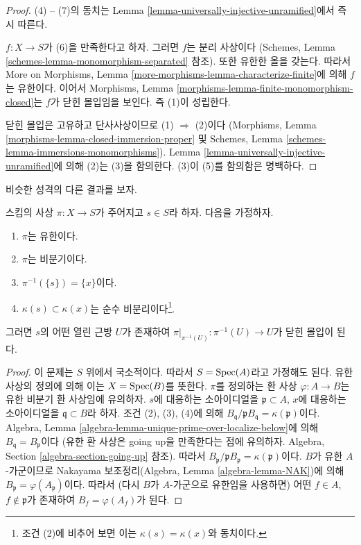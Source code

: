 \begin{proof}
(4) -- (7)의 동치는 Lemma
\ref{lemma-universally-injective-unramified}에서 즉시 따른다.

\medskip\noindent
$f : X \to S$가 (6)을 만족한다고 하자. 그러면 $f$는 분리 사상이다
(Schemes, Lemma
\ref{schemes-lemma-monomorphism-separated} 참조).
또한 유한한 올을 갖는다. 따라서
More on Morphisms, Lemma
\ref{more-morphisms-lemma-characterize-finite}에 의해 $f$는
유한이다. 이어서 Morphisms, Lemma
\ref{morphisms-lemma-finite-monomorphism-closed}는 $f$가
닫힌 몰입임을 보인다. 즉 (1)이 성립한다.

\medskip\noindent
닫힌 몰입은 고유하고 단사사상이므로 (1) $\Rightarrow$ (2)이다
(Morphisms, Lemma
\ref{morphisms-lemma-closed-immersion-proper} 및
Schemes, Lemma
\ref{schemes-lemma-immersions-monomorphisms}).
Lemma \ref{lemma-universally-injective-unramified}에 의해 (2)는
(3)을 함의한다. (3)이 (5)를 함의함은 명백하다.
\end{proof}

\noindent
비슷한 성격의 다른 결과를 보자.

\begin{lemma}
\label{lemma-finite-unramified-one-point}
스킴의 사상 $\pi : X \to S$가 주어지고 $s \in S$라 하자.
다음을 가정하자.
\begin{enumerate}
\item $\pi$는 유한이다.
\item $\pi$는 비분기이다.
\item $\pi^{-1}(\{s\}) = \{x\}$이다.
\item $\kappa(s) \subset \kappa(x)$는 순수
비분리이다\footnote{조건 (2)에 비추어 보면 이는
$\kappa(s) = \kappa(x)$와 동치이다.}.
\end{enumerate}
그러면 $s$의 어떤 열린 근방 $U$가 존재하여
$\pi|_{\pi^{-1}(U)} : \pi^{-1}(U) \to U$가 닫힌 몰입이 된다.
\end{lemma}

\begin{proof}
이 문제는 $S$ 위에서 국소적이다. 따라서 $S = \mathop{\mathrm{Spec}}(A)$라고
가정해도 된다. 유한 사상의 정의에 의해 이는 $X = \mathop{\mathrm{Spec}}(B)$를
뜻한다. $\pi$를 정의하는 환 사상 $\varphi : A \to B$는
유한 비분기 환 사상임에 유의하자.
$s$에 대응하는 소아이디얼을 $\mathfrak p \subset A$,
$x$에 대응하는 소아이디얼을 $\mathfrak q \subset B$라 하자.
조건 (2), (3), (4)에 의해
$B_{\mathfrak q}/\mathfrak pB_{\mathfrak q} = \kappa(\mathfrak p)$이다.
Algebra, Lemma
\ref{algebra-lemma-unique-prime-over-localize-below}에 의해
$B_{\mathfrak q} = B_{\mathfrak p}$이다
(유한 환 사상은 going up을 만족한다는 점에 유의하자. Algebra,
Section \ref{algebra-section-going-up} 참조).
따라서
$B_{\mathfrak p}/\mathfrak pB_{\mathfrak p} = \kappa(\mathfrak p)$이다.
$B$가 유한 $A$-가군이므로 Nakayama 보조정리(Algebra, Lemma
\ref{algebra-lemma-NAK})에 의해
$B_{\mathfrak p} = \varphi(A_{\mathfrak p})$이다. 따라서
(다시 $B$가 $A$-가군으로 유한임을 사용하면) 어떤
$f \in A$, $f \not \in \mathfrak p$가 존재하여
$B_f = \varphi(A_f)$가 된다.
\end{proof}

